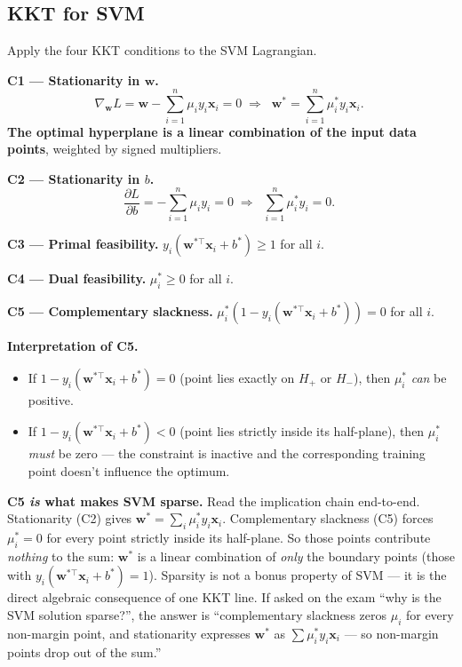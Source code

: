 \documentclass[11pt, a4paper]{article}
\begin{document}
\subsection{KKT for SVM}

Apply the four KKT conditions to the SVM Lagrangian.

\textbf{C1 — Stationarity in $\mathbf{w}$.}
\[
\nabla_\mathbf{w} L = \mathbf{w} - \sum_{i=1}^n \mu_i y_i \mathbf{x}_i = 0
\;\Longrightarrow\;
\boxed{\;\mathbf{w}^* = \sum_{i=1}^n \mu_i^* y_i \mathbf{x}_i.\;}
\]
\textbf{The optimal hyperplane is a linear combination of the input data points}, weighted by signed multipliers.

\textbf{C2 — Stationarity in $b$.}
\[
\frac{\partial L}{\partial b} = -\sum_{i=1}^n \mu_i y_i = 0
\;\Longrightarrow\;
\boxed{\;\sum_{i=1}^n \mu_i^* y_i = 0.\;}
\]

\textbf{C3 — Primal feasibility.} $y_i(\mathbf{w}^{*\top}\mathbf{x}_i + b^*) \ge 1$ for all $i$.

\textbf{C4 — Dual feasibility.} $\mu_i^* \ge 0$ for all $i$.

\textbf{C5 — Complementary slackness.} $\mu_i^*(1 - y_i(\mathbf{w}^{*\top}\mathbf{x}_i + b^*)) = 0$ for all $i$.

\textbf{Interpretation of C5.}
\begin{itemize}
  \item If $1 - y_i(\mathbf{w}^{*\top}\mathbf{x}_i + b^*) = 0$ (point lies exactly on $H_+$ or $H_-$), then $\mu_i^*$ \emph{can} be positive.
  \item If $1 - y_i(\mathbf{w}^{*\top}\mathbf{x}_i + b^*) < 0$ (point lies strictly inside its half-plane), then $\mu_i^*$ \emph{must} be zero — the constraint is inactive and the corresponding training point doesn't influence the optimum.
\end{itemize}

\textbf{C5 \emph{is} what makes SVM sparse.} Read the implication chain end-to-end. Stationarity (C2) gives $\mathbf{w}^* = \sum_i \mu_i^* y_i \mathbf{x}_i$. Complementary slackness (C5) forces $\mu_i^* = 0$ for every point strictly inside its half-plane. So those points contribute \emph{nothing} to the sum: $\mathbf{w}^*$ is a linear combination of \emph{only} the boundary points (those with $y_i(\mathbf{w}^{*\top}\mathbf{x}_i + b^*) = 1$). Sparsity is not a bonus property of SVM — it is the direct algebraic consequence of one KKT line. If asked on the exam ``why is the SVM solution sparse?'', the answer is ``complementary slackness zeros $\mu_i$ for every non-margin point, and stationarity expresses $\mathbf{w}^*$ as $\sum \mu_i^* y_i \mathbf{x}_i$ — so non-margin points drop out of the sum.''
\end{document}
